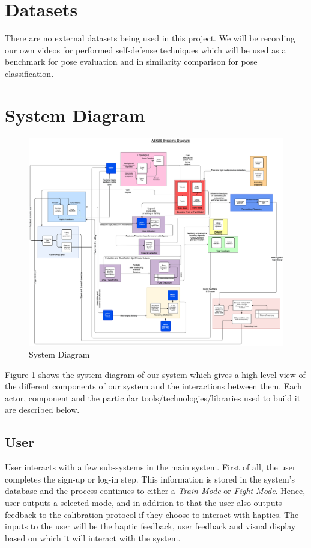 \section{Datasets}
There are no external datasets being used in this project. We will be recording our own videos for performed self-defense techniques which will be used as a benchmark for pose evaluation and in similarity comparison for pose classification.
\section{System Diagram}
\begin{figure}
    \centering
    \includegraphics[scale=0.32]{images/SystemDiagram.png}
    \caption{System Diagram}
    \label{fig:systemDiagram}
\end{figure}
\clearpage
Figure \ref{fig:systemDiagram} shows the system diagram of our system which gives a high-level view of the different components of our system and the interactions between them. Each actor, component and the particular tools/technologies/libraries used to build it are described below.
\subsection{User}
User interacts with a few sub-systems in the main system. First of all, the user completes the sign-up or log-in step. This information is stored in the system's database and the process continues to either a \textit{Train Mode} or \textit{Fight Mode}. Hence, user outputs a selected mode, and in addition to that the user also outputs feedback to the calibration protocol if they choose to interact with haptics. The inputs to the user will be the haptic feedback, user feedback and visual display based on which it will interact with the system.

